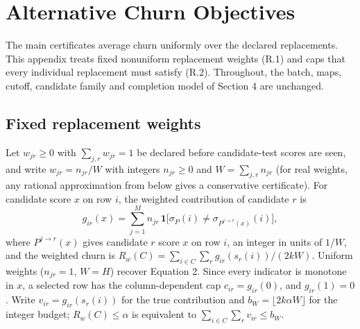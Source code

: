 \documentclass[11pt]{article}
\newcommand{\ind}{\mathbf{1}}
\begin{document}
\setcounter{page}{101}
\renewcommand{\thesection}{\Alph{section}}
\setcounter{section}{17}

\section{Alternative Churn Objectives}
\label{app:objectives}
The main certificates average churn uniformly over the declared replacements. This appendix treats fixed nonuniform replacement weights (R.1) and caps that every individual replacement must satisfy (R.2). Throughout, the batch, maps, cutoff, candidate family and completion model of Section 4 are unchanged.

\subsection{Fixed replacement weights}
\label{app:weights}
Let $w_{jr}\ge0$ with $\sum_{j,r}w_{jr}=1$ be declared before candidate-test scores are seen, and write $w_{jr}=n_{jr}/W$ with integers $n_{jr}\ge0$ and $W=\sum_{j,r}n_{jr}$ (for real weights, any rational approximation from below gives a conservative certificate). For candidate score $x$ on row $i$, the weighted contribution of candidate $r$ is
\[
g_{ir}(x)=\sum_{j=1}^{M}n_{jr}\,\ind\big[\sigma_P(i)\neq\sigma_{P^{j\to r}(x)}(i)\big],
\]
where $P^{j\to r}(x)$ gives candidate $r$ score $x$ on row $i$,
an integer in units of $1/W$, and the weighted churn is $R_w(C)=\sum_{i\in C}\sum_r g_{ir}(s_r(i))/(2kW)$. Uniform weights ($n_{jr}=1$, $W=H$) recover Equation 2. Since every indicator is monotone in $x$, a selected row has the column-dependent cap $c_{ir}=g_{ir}(0)$, and $g_{ir}(1)=0$. Write $v_{ir}=g_{ir}(s_r(i))$ for the true contribution and $b_W=\lfloor 2k\alpha W\rfloor$ for the integer budget; $R_w(C)\le\alpha$ is equivalent to $\sum_{i\in C}\sum_rv_{ir}\le b_W$.
\end{document}
